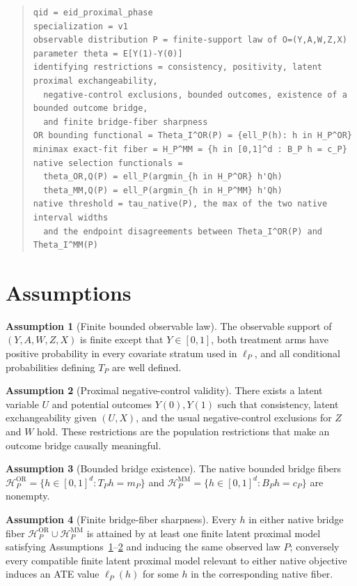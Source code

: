 \documentclass[11pt]{article}
\newcommand{\calH}{\mathcal{H}}
\theoremstyle{definition}
\newtheorem{assumption}{Assumption}
\theoremstyle{plain}
\theoremstyle{remark}
\begin{document}
\begin{quote}
\begin{verbatim}
qid = eid_proximal_phase
specialization = v1
observable distribution P = finite-support law of O=(Y,A,W,Z,X)
parameter theta = E[Y(1)-Y(0)]
identifying restrictions = consistency, positivity, latent proximal exchangeability,
  negative-control exclusions, bounded outcomes, existence of a bounded outcome bridge,
  and finite bridge-fiber sharpness
OR bounding functional = Theta_I^OR(P) = {ell_P(h): h in H_P^OR}
minimax exact-fit fiber = H_P^MM = {h in [0,1]^d : B_P h = c_P}
native selection functionals =
  theta_OR,Q(P) = ell_P(argmin_{h in H_P^OR} h'Qh)
  theta_MM,Q(P) = ell_P(argmin_{h in H_P^MM} h'Qh)
native threshold = tau_native(P), the max of the two native interval widths
  and the endpoint disagreements between Theta_I^OR(P) and Theta_I^MM(P)
\end{verbatim}
\end{quote}

\section{Assumptions}
\begin{assumption}[Finite bounded observable law]\label{ass:finite-bounded}
The observable support of \((Y,A,W,Z,X)\) is finite except that
\(Y\in[0,1]\), both treatment arms have positive probability in every
covariate stratum used in \(\ell_P\), and all conditional probabilities
defining \(T_P\) are well defined.
\end{assumption}

\begin{assumption}[Proximal negative-control validity]\label{ass:proximal-valid}
There exists a latent variable \(U\) and potential outcomes \(Y(0),Y(1)\)
such that consistency, latent exchangeability given \((U,X)\), and the usual
negative-control exclusions for \(Z\) and \(W\) hold.  These restrictions are
the population restrictions that make an outcome bridge causally meaningful.
\end{assumption}

\begin{assumption}[Bounded bridge existence]\label{ass:bridge-exists}
The native bounded bridge fibers
\(\calH_P^{\mathrm{OR}}=\{h\in[0,1]^d:T_Ph=m_P\}\) and
\(\calH_P^{\mathrm{MM}}=\{h\in[0,1]^d:B_Ph=c_P\}\) are nonempty.
\end{assumption}

\begin{assumption}[Finite bridge-fiber sharpness]\label{ass:fiber-sharp}
Every \(h\) in either native bridge fiber
\(\calH_P^{\mathrm{OR}}\cup\calH_P^{\mathrm{MM}}\) is attained by at least
one finite latent proximal model satisfying
Assumptions~\ref{ass:finite-bounded}--\ref{ass:proximal-valid} and inducing
the same observed law \(P\); conversely every compatible finite latent
proximal model relevant to either native objective induces an ATE value
\(\ell_P(h)\) for some \(h\) in the corresponding native fiber.
\end{assumption}
\end{document}
